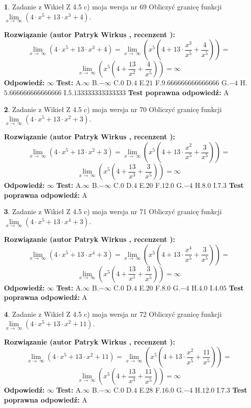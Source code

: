 \documentclass[12pt, a4paper]{article}
\theoremstyle{definition} %
\newtheorem{zad}{}
\newcommand{\zadStart}[1]{\begin{zad}#1\newline}
\newcommand{\zadStop}{\end{zad}}
\newcommand{\rozwStart}[2]{\noindent \textbf{Rozwiązanie (autor #1 , recenzent #2): }\newline}
\newcommand{\rozwStop}{\newline}
\newcommand{\odpStart}{\noindent \textbf{Odpowiedź:}\newline}
\newcommand{\odpStop}{\newline}
\newcommand{\testStart}{\noindent \textbf{Test:}\newline}
\newcommand{\testStop}{\newline}
\newcommand{\kluczStart}{\noindent \textbf{Test poprawna odpowiedź:}\newline}
\newcommand{\kluczStop}{\newline}
\begin{document}
\zadStart{Zadanie z Wikieł Z 4.5 c) moja wersja nr 69}
Obliczyć granicę funkcji  $\lim\limits_{x\to\ \infty}(4 \cdot x^{5}+13 \cdot x^{3}+4)$.
\zadStop
\rozwStart{Patryk Wirkus}{}
$$\lim\limits_{x\to\ \infty}(4 \cdot x^{5}+13 \cdot x^{3}+4) = \lim\limits_{x\to\ \infty}(x^{5}(4 +13 \cdot \frac{x^{3}}{x^{5}}+\frac{4}{x^{5}})) =$$ $$\lim\limits_{x\to\ \infty}(x^{5}(4 +\frac{13}{x^{2}}+\frac{4}{x^{5}})) =\infty$$
\rozwStop
\odpStart
$\infty$
\odpStop
\testStart
A.$\infty$ B.$-\infty$ C.$0$ D.$4$ E.$21$
F.$9.666666666666666$ G.$-4$
H.$5.666666666666666$
I.$5.133333333333333$
\testStop
\kluczStart
A
\kluczStop



\zadStart{Zadanie z Wikieł Z 4.5 c) moja wersja nr 70}
Obliczyć granicę funkcji  $\lim\limits_{x\to\ \infty}(4 \cdot x^{5}+13 \cdot x^{2}+3)$.
\zadStop
\rozwStart{Patryk Wirkus}{}
$$\lim\limits_{x\to\ \infty}(4 \cdot x^{5}+13 \cdot x^{2}+3) = \lim\limits_{x\to\ \infty}(x^{5}(4 +13 \cdot \frac{x^{2}}{x^{5}}+\frac{3}{x^{5}})) =$$ $$\lim\limits_{x\to\ \infty}(x^{5}(4 +\frac{13}{x^{3}}+\frac{3}{x^{5}})) =\infty$$
\rozwStop
\odpStart
$\infty$
\odpStop
\testStart
A.$\infty$ B.$-\infty$ C.$0$ D.$4$ E.$20$
F.$12.0$ G.$-4$
H.$8.0$
I.$7.3$
\testStop
\kluczStart
A
\kluczStop



\zadStart{Zadanie z Wikieł Z 4.5 c) moja wersja nr 71}
Obliczyć granicę funkcji  $\lim\limits_{x\to\ \infty}(4 \cdot x^{5}+13 \cdot x^{4}+3)$.
\zadStop
\rozwStart{Patryk Wirkus}{}
$$\lim\limits_{x\to\ \infty}(4 \cdot x^{5}+13 \cdot x^{4}+3) = \lim\limits_{x\to\ \infty}(x^{5}(4 +13 \cdot \frac{x^{4}}{x^{5}}+\frac{3}{x^{5}})) =$$ $$\lim\limits_{x\to\ \infty}(x^{5}(4 +\frac{13}{x^{1}}+\frac{3}{x^{5}})) =\infty$$
\rozwStop
\odpStart
$\infty$
\odpStop
\testStart
A.$\infty$ B.$-\infty$ C.$0$ D.$4$ E.$20$
F.$8.0$ G.$-4$
H.$4.0$
I.$4.05$
\testStop
\kluczStart
A
\kluczStop



\zadStart{Zadanie z Wikieł Z 4.5 c) moja wersja nr 72}
Obliczyć granicę funkcji  $\lim\limits_{x\to\ \infty}(4 \cdot x^{5}+13 \cdot x^{2}+11)$.
\zadStop
\rozwStart{Patryk Wirkus}{}
$$\lim\limits_{x\to\ \infty}(4 \cdot x^{5}+13 \cdot x^{2}+11) = \lim\limits_{x\to\ \infty}(x^{5}(4 +13 \cdot \frac{x^{2}}{x^{5}}+\frac{11}{x^{5}})) =$$ $$\lim\limits_{x\to\ \infty}(x^{5}(4 +\frac{13}{x^{3}}+\frac{11}{x^{5}})) =\infty$$
\rozwStop
\odpStart
$\infty$
\odpStop
\testStart
A.$\infty$ B.$-\infty$ C.$0$ D.$4$ E.$28$
F.$16.0$ G.$-4$
H.$12.0$
I.$7.3$
\testStop
\kluczStart
A
\kluczStop
\end{document}
